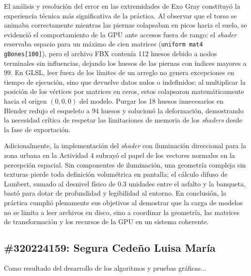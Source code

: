El análisis y resolución del error en las extremidades de Exo Gray constituyó la experiencia técnica más significativa de la práctica. Al observar que el torso se animaba correctamente mientras las piernas colapsaban en picos hacia el suelo, se evidenció el comportamiento de la GPU ante accesos fuera de rango: el \textit{shader} reservaba espacio para un máximo de cien matrices (\texttt{uniform mat4 gBones[100]}), pero el archivo FBX contenía 112 huesos debido a nodos terminales sin influencias, dejando los huesos de las piernas con índices mayores a 99. En GLSL, leer fuera de los límites de un arreglo no genera excepciones en tiempo de ejecución, sino que devuelve datos nulos o indefinidos; al multiplicar la posición de los vértices por matrices en ceros, estos colapsaron matemáticamente hacia el origen $(0,0,0)$ del modelo. Purgar los 18 huesos innecesarios en Blender redujo el esqueleto a 94 huesos y solucionó la deformación, demostrando la necesidad crítica de respetar las limitaciones de memoria de los \textit{shaders} desde la fase de exportación.

Adicionalmente, la implementación del \textit{shader} con iluminación direccional para la zona urbana en la Actividad 4 subrayó el papel de los vectores normales en la percepción espacial. Sin componentes de iluminación, una geometría compleja sin texturas pierde toda definición volumétrica en pantalla; el cálculo difuso de Lambert, sumado al desnivel físico de 0.3 unidades entre el asfalto y la banqueta, bastó para dotar de profundidad y legibilidad al entorno. En conclusión, la práctica cumplió plenamente sus objetivos al demostrar que la carga de modelos no se limita a leer archivos en disco, sino a coordinar la geometría, las matrices de transformación y los recursos de la GPU en un sistema coherente.

\subsection*{\#320224159: Segura Cedeño Luisa María}
Como resultado del desarrollo de los algoritmos y pruebas gráficas...
